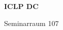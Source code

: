\documentclass[a4paper]{article}
\begin{document}
\begin{center}
\begin{vsltext}{2.5cm}{4cm}

   \vspace{0.5cm} 

    \textbf{ICLP DC} 

    \vspace{1.5cm}

    Seminarraum 107 

\end{vsltext}

\end{center}
\end{document}
